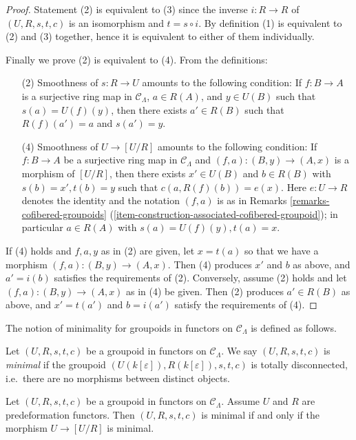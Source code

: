 \begin{proof}
Statement (2) is equivalent to (3) since the inverse $i: R \to R$ of 
$(U, R, s,t,c)$ is an isomorphism and $t = s \circ i$. By definition (1) is 
equivalent to (2) and (3) together, hence it is equivalent to either of them 
individually. 

\medskip \noindent
Finally we prove (2) is equivalent to (4). From the definitions:
\begin{enumerate}
\item[(2)] Smoothness of $s: R \to U$ amounts to the following 
condition: If $f: B \to A$ is a surjective ring map in $\mathcal 
C_\Lambda$, $a \in R(A)$, and $y \in U(B)$ such that $s(a) = U(f)(y)$, then 
there exists $a' \in R(B)$ such that $R(f)(a') = a$ and $s(a') = y$.

\item[(4)] Smoothness of $U \to [U/R]$ amounts to the following 
condition: If $f: B \to A$ be a surjective ring map in $\mathcal 
C_\Lambda$ and $(f,a): (B,y) \to (A,x)$ is a morphism of $[U/R]$, 
then there exists $x' \in U(B)$ and $b \in R(B)$ with $s(b) = x', t(b) = y$ 
such that $c(a,R(f)(b)) = e(x)$.  Here $e: U \to R$ denotes the 
identity and the notation $(f,a)$ is as in Remarks 
\ref{remarks-cofibered-groupoids} 
(\ref{item-construction-associated-cofibered-groupoid});
in particular $a \in R(A)$ with $s(a) = U(f)(y), t(a) = x$.  
\end{enumerate}
If (4) holds and $f,a,y$ as in (2) are given, let $x = t(a)$ so that we have a 
morphism $(f,a): (B,y) \to (A,x)$.  Then (4) produces $x'$ and $b$ as 
above, and $a' = i(b)$ satisfies the requirements of (2).  Conversely, assume 
(2) holds and let $(f,a): (B,y) \to (A,x)$ as in (4) be given.  Then 
(2) produces $a' \in R(B)$ as above, and $x' = t(a')$ and $b = i(a')$ satisfy 
the requirements of (4).
\end{proof}

\noindent
The notion of minimality for groupoids in functors on $\mathcal{C}_\Lambda$ is 
defined as follows.

\begin{definition}
\label{definition-minimal-groupoid-in-functors}
Let $(U, R, s,t,c)$ be a groupoid in functors on $\mathcal{C}_\Lambda$.  We 
say $(U, R, s,t,c)$ is {\it minimal} if the groupoid 
$(U(k[\varepsilon]),R(k[\varepsilon]), s,t,c)$ is totally disconnected, i.e.\ 
there are no morphisms between distinct objects.
\end{definition}

\begin{lemma}
\label{lemma-characterize-minimal-groupoid-in-functors}
Let $(U, R, s,t,c)$ be a groupoid in functors on $\mathcal{C}_\Lambda$.  
Assume $U$ and $R$ are predeformation functors.  Then $(U,R,s,t,c)$ is minimal 
if and only if the morphism $U \to [U/R]$ is minimal.
\end{lemma}

